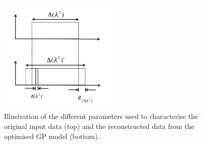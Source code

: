 \documentclass[fleqn,usenatbib]{mnras}
\begin{document}
%
%

%
%
%

\begin{figure}
\includegraphics[width=0.5\textwidth]{./FIGURES/faraday_resampling.png}
\caption{\label{fig:resampling} Illustration of the different parameters used to characterise the original input data (top) and the reconstructed data from the optimised GP model (bottom).}
\end{figure}
\end{document}
